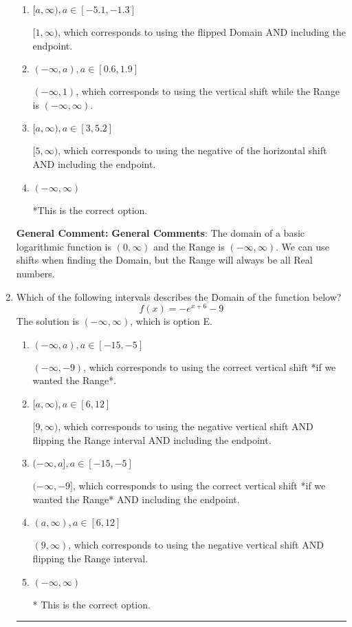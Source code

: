 \documentclass{extbook}[14pt]
\newcommand{\litem}[1]{\item #1

\rule{\textwidth}{0.4pt}}
\begin{document}
\begin{enumerate}
{\begin{enumerate}[label=\Alph*.]
$(-\infty, -1)$, which corresponds to using the using the negative of vertical shift on $(0, \infty)$.
\item \( [a, \infty), a \in [-5.1, -1.3] \)

$[1, \infty)$, which corresponds to using the flipped Domain AND including the endpoint.
\item \( (-\infty, a), a \in [0.6, 1.9] \)

$(-\infty, 1)$, which corresponds to using the vertical shift while the Range is $(-\infty, \infty)$.
\item \( [a, \infty), a \in [3, 5.2] \)

$[5, \infty)$, which corresponds to using the negative of the horizontal shift AND including the endpoint.
\item \( (-\infty, \infty) \)

*This is the correct option.
\end{enumerate}

\textbf{General Comment:} \textbf{General Comments}: The domain of a basic logarithmic function is $(0, \infty)$ and the Range is $(-\infty, \infty)$. We can use shifts when finding the Domain, but the Range will always be all Real numbers.
}
\litem{
Which of the following intervals describes the Domain of the function below?
\[ f(x) = -e^{x+6}-9 \]The solution is \( (-\infty, \infty) \), which is option E.\begin{enumerate}[label=\Alph*.]
\item \( (-\infty, a), a \in [-15, -5] \)

$(-\infty, -9)$, which corresponds to using the correct vertical shift *if we wanted the Range*.
\item \( [a, \infty), a \in [6, 12] \)

$[9, \infty)$, which corresponds to using the negative vertical shift AND flipping the Range interval AND including the endpoint.
\item \( (-\infty, a], a \in [-15, -5] \)

$(-\infty, -9]$, which corresponds to using the correct vertical shift *if we wanted the Range* AND including the endpoint.
\item \( (a, \infty), a \in [6, 12] \)

$(9, \infty)$, which corresponds to using the negative vertical shift AND flipping the Range interval.
\item \( (-\infty, \infty) \)

* This is the correct option.
\end{enumerate}

}
\end{enumerate}
\end{document}
